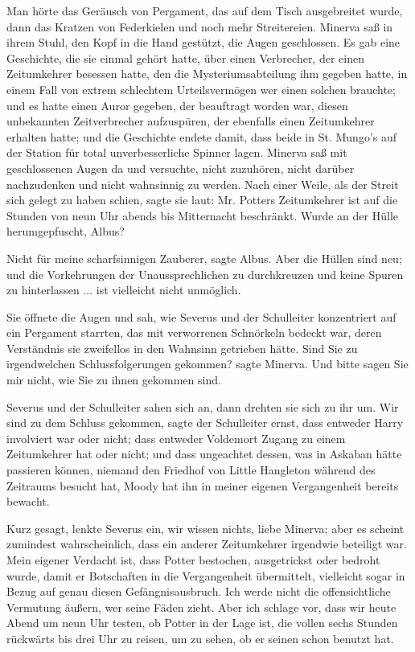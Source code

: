 Man hörte das Geräusch von Pergament, das auf dem Tisch ausgebreitet wurde, dann
das Kratzen von Federkielen und noch mehr Streitereien. Minerva saß in ihrem
Stuhl, den Kopf in die Hand gestützt, die Augen geschlossen. Es gab eine
Geschichte, die sie einmal gehört hatte, über einen Verbrecher, der einen
Zeitumkehrer besessen hatte, den die Mysteriumsabteilung ihm gegeben hatte, in
einem Fall von extrem schlechtem Urteilsvermögen wer einen solchen brauchte; und
es hatte einen Auror gegeben, der beauftragt worden war, diesen unbekannten
Zeitverbrecher aufzuspüren, der ebenfalls einen Zeitumkehrer erhalten hatte; und
die Geschichte endete damit, dass beide in St. Mungo's auf der Station für total
unverbesserliche Spinner lagen. Minerva saß mit geschlossenen Augen da und
versuchte, nicht zuzuhören, nicht darüber nachzudenken und nicht wahnsinnig zu
werden. Nach einer Weile, als der Streit sich gelegt zu haben schien, sagte sie
laut: \glqq{}Mr. Potters Zeitumkehrer ist auf die Stunden von neun Uhr abends bis
Mitternacht beschränkt. Wurde an der Hülle herumgepfuscht, Albus?\grqq{}

\glqq{}Nicht für meine scharfsinnigen Zauberer\grqq{}, sagte Albus. \glqq{}Aber
die Hüllen sind neu; und die Vorkehrungen der Unaussprechlichen zu durchkreuzen
und keine Spuren zu hinterlassen ... ist vielleicht nicht unmöglich.\grqq{}

Sie öffnete die Augen und sah, wie Severus und der Schulleiter konzentriert auf
ein Pergament starrten, das mit verworrenen Schnörkeln bedeckt war, deren
Verständnis sie zweifellos in den Wahnsinn getrieben hätte. \glqq{}Sind Sie zu
irgendwelchen Schlussfolgerungen gekommen?\grqq{} sagte Minerva. \glqq{}Und bitte
sagen Sie mir nicht, wie Sie zu ihnen gekommen sind.\grqq{}

Severus und der Schulleiter sahen sich an, dann drehten sie sich zu ihr um.
\glqq{}Wir sind zu dem Schluss gekommen\grqq{}, sagte der Schulleiter ernst,
\glqq{}dass entweder Harry involviert war oder nicht; dass entweder Voldemort
Zugang zu einem Zeitumkehrer hat oder nicht; und dass ungeachtet dessen, was in
Askaban hätte passieren können, niemand den Friedhof von Little Hangleton
während des Zeitraums besucht hat, Moody hat ihn in meiner eigenen Vergangenheit
bereits bewacht.\grqq{}

\glqq{}Kurz gesagt\grqq{}, lenkte Severus ein, \glqq{}wir wissen nichts, liebe
Minerva; aber es scheint zumindest wahrscheinlich, dass ein anderer Zeitumkehrer
irgendwie beteiligt war. Mein eigener Verdacht ist, dass Potter bestochen,
ausgetrickst oder bedroht wurde, damit er Botschaften in die Vergangenheit
übermittelt, vielleicht sogar in Bezug auf genau diesen Gefängnisausbruch. Ich
werde nicht die offensichtliche Vermutung äußern, wer seine Fäden zieht. Aber
ich schlage vor, dass wir heute Abend um neun Uhr testen, ob Potter in der Lage
ist, die vollen sechs Stunden rückwärts bis drei Uhr zu reisen, um zu sehen, ob
er seinen schon benutzt hat.\grqq{}

